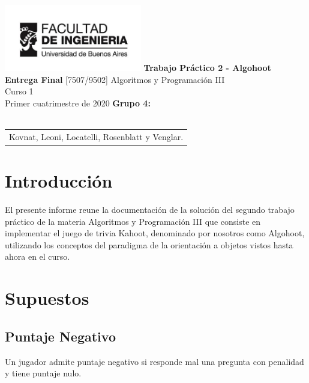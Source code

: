 \documentclass[titlepage,a4paper]{article}
\begin{document}
\begin{titlepage} %
	\hfill\includegraphics[width=6cm]{img/logofiuba.jpg}
    \centering
    \vfill
    \Huge \textbf{Trabajo Práctico 2 - Algohoot\\ Entrega Final}
    \vskip2cm
    \Large [7507/9502] Algoritmos y Programación III\\
    Curso 1\\ %
    Primer cuatrimestre de 2020 
    \vfill
    \textbf{Grupo 4:}\\$ $\\
    \begin{tabular}{  l  } %
      Kovnat, Leoni, Locatelli, Rosenblatt y Venglar. %
  	\end{tabular}
    \vfill
    \vfill
\end{titlepage}

\tableofcontents %
\newpage

\section{Introducción}\label{sec:intro}
El presente informe reune la documentación de la solución del segundo trabajo práctico de la materia Algoritmos y Programación III que consiste en implementar el juego de trivia Kahoot, denominado por nosotros como Algohoot, utilizando los conceptos del paradigma de la orientación a objetos vistos hasta ahora en el curso.

\section{Supuestos}\label{sec:supuestos}

\subsection{Puntaje Negativo}

Un jugador admite puntaje negativo si responde mal una pregunta con penalidad y tiene puntaje nulo. 
\end{document}
